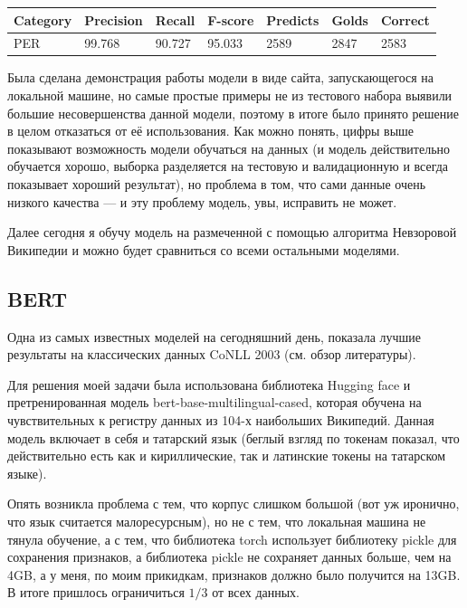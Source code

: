 \medskip

\begin{tabular}{| l | l | l | l | l | l | l |}
\hline
Category               & Precision  &   Recall   &  F-score   &  Predicts  &   Golds    &  Correct   \\

\hline
 PER                                 & 99.768     & 90.727     & 95.033     & 2589       & 2847       & 2583       \\
\hline
\end{tabular}


Была сделана демонстрация работы модели в виде сайта, запускающегося на локальной машине, но самые простые примеры не из тестового набора выявили большие несовершенства данной модели, поэтому в итоге было принято решение в целом отказаться от её использования. Как можно понять, цифры выше показывают возможность модели обучаться на данных (и модель действительно обучается хорошо, выборка разделяется на тестовую и валидационную и всегда показывает хороший результат), но проблема в том, что сами данные очень низкого качества --- и эту проблему модель, увы, исправить не может.


Далее сегодня я обучу модель на размеченной с помощью алгоритма Невзоровой Википедии и можно будет сравниться со всеми остальными моделями.


\subsection{BERT}

\cite{DBLP:journals/corr/abs-1810-04805} Одна из самых известных моделей на сегодняшний день, показала лучшие результаты на классических данных CoNLL 2003 (см. обзор литературы).

Для решения моей задачи была использована библиотека Hugging face \cite{Wolf2019HuggingFacesTS} и претренированная модель bert-base-multilingual-cased, которая обучена на чувствительных к регистру данных из 104-х наибольших Википедий. Данная модель включает в себя и татарский язык (беглый взгляд по токенам показал, что действительно есть как и кириллические, так и латинские токены на татарском языке). 

Опять возникла проблема с тем, что корпус слишком большой (вот уж иронично, что язык считается малоресурсным), но не с тем, что локальная машина не тянула обучение, а с тем, что библиотека torch использует библиотеку pickle для сохранения признаков, а библиотека pickle не сохраняет данных больше, чем на 4GB, а у меня, по моим прикидкам, признаков должно было получится на 13GB. В итоге пришлось ограничиться $1/3$ от всех данных. 

